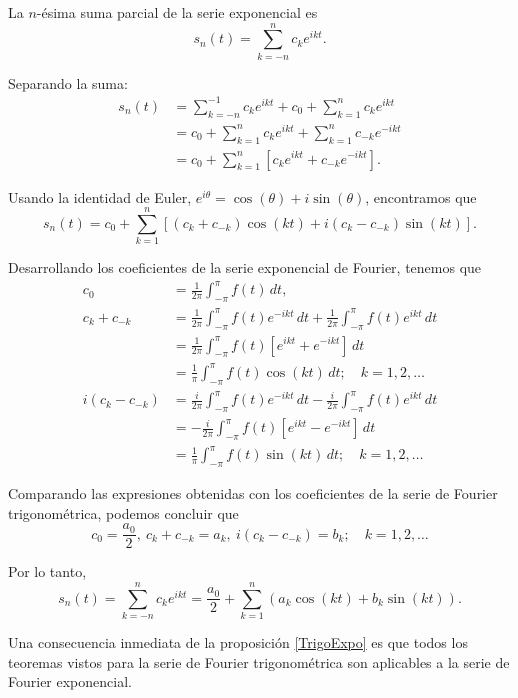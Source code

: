 \begin{demo}
La $n$-ésima suma parcial de la serie exponencial es
$$ s_n(t) = \sum_{k=-n}^n c_k e^{ikt}.$$

Separando la suma:
\begin{align*}
    s_n(t) &= \sum_{k=-n}^{-1} c_k e^{ikt} + c_0 + \sum_{k=1}^n c_k e^{ikt} \\
    &= c_0 + \sum_{k=1}^n c_k e^{ikt} + \sum_{k=1}^n c_{-k} e^{-ikt} \\
    &= c_0 + \sum_{k=1}^n [c_k e^{ikt} + c_{-k} e^{-ikt}]. 
\end{align*}

Usando la identidad de Euler, $e^{i\theta} = \cos(\theta) + i \sin(\theta)$, encontramos que
$$s_n(t) = c_0 +  \sum_{k=1}^n [(c_k + c_{-k}) \cos(kt) + i(c_k - c_{-k}) \sin(kt)].$$

Desarrollando los coeficientes de la serie exponencial de Fourier, tenemos que
\begingroup
\allowdisplaybreaks
\begin{align*}
    c_0 &= \frac{1}{2\pi} \int_{-\pi}^{\pi} f(t) \,dt, \\
    c_k + c_{-k} &= \frac{1}{2\pi} \int_{-\pi}^{\pi} f(t) e^{-ikt} \,dt + \frac{1}{2\pi} \int_{-\pi}^{\pi} f(t) e^{ikt} \,dt  \\
    &= \frac{1}{2\pi} \int_{-\pi}^{\pi} f(t) [e^{ikt} + e^{-ikt}] \,dt \\
    &= \frac{1}{\pi} \int_{-\pi}^{\pi} f(t) \cos(kt) \,dt; \quad k = 1,2, \dots\\
   i( c_k - c_{-k}) &= \frac{i}{2\pi} \int_{-\pi}^{\pi} f(t) e^{-ikt} \,dt - \frac{i}{2\pi} \int_{-\pi}^{\pi} f(t) e^{ikt} \,dt \\
   &= - \frac{i}{2\pi} \int_{-\pi}^{\pi} f(t) [e^{ikt} - e^{-ikt}] \,dt \\
   &= \frac{1}{\pi} \int_{-\pi}^{\pi} f(t) \sin(kt)\,dt; \quad k = 1,2, \dots
\end{align*}
\endgroup

Comparando las expresiones obtenidas con los coeficientes de la serie de Fourier trigonométrica, podemos concluir que 
$$c_0 = \frac{a_0}{2}, ~  c_k + c_{-k} = a_k, ~ i( c_k - c_{-k}) = b_k; \quad k = 1,2, \dots$$

Por lo tanto, 
$$ s_n(t) = \sum_{k=-n}^n c_k e^{ikt} = \frac{a_0}{2} + \sum_{k=1}^n (a_k \cos(kt) + b_k \sin(kt)).$$

\end{demo}
Una consecuencia inmediata de la proposición \ref{TrigoExpo} es que todos los teoremas vistos para la serie de Fourier trigonométrica son aplicables a la serie de Fourier exponencial.

